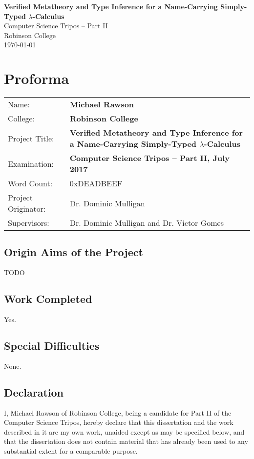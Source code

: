 \documentclass[12pt,a4paper,twoside,openright]{report}
\author{Michael Rawson}
\date{2016--17}
\newcommand{\thetitle}{Verified Metatheory and Type Inference for a Name-Carrying Simply-Typed \(\lambda\)-Calculus}
\begin{document}
%

\pagestyle{empty}
\vspace*{60mm}
\begin{center}
\Huge
\textbf{\thetitle}\\[5mm]
Computer Science Tripos -- Part II\\[5mm]
Robinson College\\[5mm]
\today
\end{center}

\pagestyle{plain}
\chapter*{Proforma}
{\large
\begin{tabular}{ll}
Name:              & \bf Michael Rawson\\
College:           & \bf Robinson College\\
Project Title:     & \bf \thetitle\\
Examination:       & \bf Computer Science Tripos -- Part II, July 2017\\
Word Count:        & 0xDEADBEEF\footnotemark[1]\\
Project Originator:& Dr. Dominic Mulligan\\
Supervisors:       & Dr. Dominic Mulligan and Dr. Victor Gomes\\
\end{tabular}
}

\section*{Origin Aims of the Project}
TODO

\section*{Work Completed}
Yes.

\section*{Special Difficulties}
None.

\newpage
\section*{Declaration}
I, Michael Rawson of Robinson College, being a candidate for Part II of the Computer Science Tripos, hereby declare that this dissertation and the work described in it are my own work, unaided except as may be specified below, and that the dissertation does not contain material that has already been used to any substantial extent for a comparable purpose.
\end{document}
